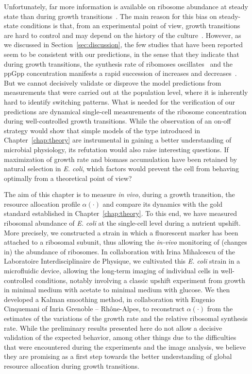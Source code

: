 Unfortunately, far more information is available on ribosome abundance at steady state than during growth transitions~\cite{scott_interdependence_2010,gausing_regulation_1980}.
The main reason for this bias on steady-state conditions is that, from an experimental point of view, growth transitions are hard to control and may depend on the history of the culture~\cite{ng_damage_1962,dufrenne_effect_1997,shaw_effect_1967,mcmeekin_predictive_2002,cheroutre-vialette_application_2002}.
However, as we discussed in Section~\ref{sec:discussion}, the few studies that have been reported seem to be consistent with our predictions, in the sense that they indicate that during growth transitions, the synthesis rate of ribomoses oscillates~\cite{gausing_regulation_1980,zengel_transcription_1986} and the ppGpp concentration manifests a rapid succession of increases and decreases~\cite{friesen_synthesis_1975,murray_control_2003}.
But we cannot decisively validate or disprove the model predictions from measurements that were carried out at the population level, where it is inherently hard to identify switching patterns.
What is needed for the verification of our predictions are dynamical single-cell measurements of the ribosome concentration during well-controlled growth transitions.
While the observation of an on-off strategy would show that simple models of the type introduced in Chapter~\ref{chap:theory} are instrumental in gaining a better understanding of microbial physiology, its refutation would also raise interesting questions. 
If maximization of growth rate and biomass accumulation have been retained by natural selection in \textit{E. coli}, which factors would prevent the cell from behaving optimally from a theoretical point of view?

The aim of this chapter is to measure \textit{in vivo}, during a growth transition, the resource allocation profile $\alpha (\cdot)$ and compare its dynamics with the gold standard established in Chapter~\ref{chap:theory}.
To this end, we have measured ribosomal abundance of \textit{E. coli} at the single-cell level during a nutrient upshift.
More precisely, we constructed a strain in which a fluorescent marker has been attached to a ribosomal subunit, thus allowing the \textit{in-vivo} monitoring of (changes in) the abundance of ribosomes.
In collaboration with Irina Mihalcescu of the Laboratoire Interdisciplinaire de Physique, we cultivated this \textit{E. coli} strain in a microfluidic device, allowing the long-term imaging of individual cells in well-controlled conditions, notably involving a classic upshift experiment from growth in minimal medium with acetate to minimal medium with glucose.
We then developed a Kalman smoothing method, in collaboration with Eugenio Cinquemani of Inria Grenoble -- Rh\^{o}ne-Alpes, to reconstruct $\alpha (\cdot)$  from the estimates of the variations of the growth rate and the relative ribosomal synthesis rate.
While the preliminary results presented here do not allow a decisive validation of the expected behavior, among other things due to the difficulties that were encountered during the experiments and the image analysis, we believe they are promising as a first step towards the better understanding of global resource allocation during growth transitions.

